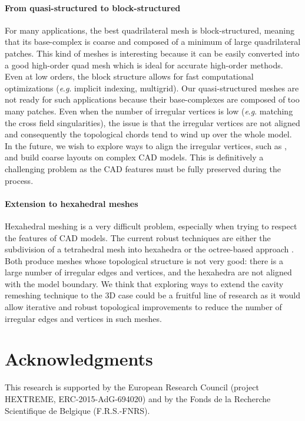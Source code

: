 \documentclass[AMA,STIX1COL]{WileyNJD-v2}
\newcommand{\eg}{\textit{e}.\textit{g}. }
\begin{document}
{\paragraph{From quasi-structured to block-structured}
For many applications, the best quadrilateral mesh is block-structured,
meaning that its base-complex is coarse and composed of a minimum of
large quadrilateral patches.
This kind of meshes is interesting because it can be easily converted 
into a good high-order quad mesh which is ideal for accurate high-order
methods. Even at low orders, the block structure allows for fast
computational optimizations (\eg implicit indexing, multigrid).
Our quasi-structured meshes are not ready for such applications because their
base-complexes are composed of too many patches.
Even when the number of irregular vertices is low (\eg matching the cross field
singularities), the issue is that the irregular vertices are not aligned
and consequently the topological chords tend to wind up over the whole model.
In the future, we wish to explore ways to align the irregular vertices, such as
\cite{bommes2011}, and build coarse layouts on complex CAD models. This is
definitively a challenging problem as the CAD features must be fully preserved
during the process.

\paragraph{Extension to hexahedral meshes}

Hexahedral meshing is a very difficult problem, especially
when trying to respect the features of CAD models. The current
robust techniques are either the subdivision of a tetrahedral mesh into
hexahedra or the octree-based approach \cite{marechal2009}. Both produce
meshes whose topological structure is not very good: there
is a large number of irregular edges and vertices, and the hexahedra
are not aligned with the model boundary.  We think that exploring ways to
extend the cavity remeshing technique to the 3D case could be a fruitful line
of research as it would allow iterative and robust topological improvements
to reduce the number of irregular edges and vertices in such meshes.


\section*{Acknowledgments}
This research is supported by the European Research Council (project HEXTREME,
ERC-2015-AdG-694020) and by the Fonds de la Recherche Scientifique de Belgique (F.R.S.-FNRS).


}
\end{document}
